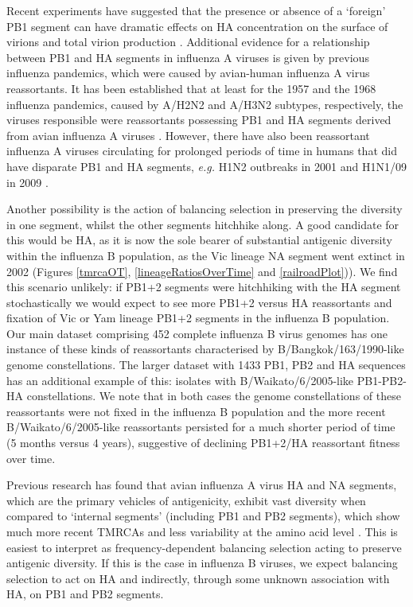 \documentclass[11pt,oneside,letterpaper]{article}
\begin{document}
Recent experiments have suggested that the presence or absence of a `foreign' PB1 segment can have dramatic effects on HA concentration on the surface of virions and total virion production \cite{cobbin2013}.
Additional evidence for a relationship between PB1 and HA segments in influenza A viruses is given by previous influenza pandemics, which were caused by avian-human influenza A virus reassortants.
It has been established that at least for the 1957 and the 1968 influenza pandemics, caused by A/H2N2 and A/H3N2 subtypes, respectively, the viruses responsible were reassortants possessing PB1 and HA segments derived from avian influenza A viruses \cite{kawaoka1989}.
However, there have also been reassortant influenza A viruses circulating for prolonged periods of time in humans that did have disparate PB1 and HA segments, \textit{e.g.} H1N2 outbreaks in 2001 \cite{gregory2002} and H1N1/09 in 2009 \cite{smith2009}.

Another possibility is the action of balancing selection in preserving the diversity in one segment, whilst the other segments hitchhike along.
A good candidate for this would be HA, as it is now the sole bearer of substantial antigenic diversity within the influenza B population, as the Vic lineage NA segment went extinct in 2002 (Figures \ref{tmrcaOT}, \ref{lineageRatiosOverTime} and \ref{railroadPlot})).
We find this scenario unlikely: if PB1+2 segments were hitchhiking with the HA segment stochastically we would expect to see more PB1+2 versus HA reassortants and fixation of Vic or Yam lineage PB1+2 segments in the influenza B population.
Our main dataset comprising 452 complete influenza B virus genomes has one instance of these kinds of reassortants characterised by B/Bangkok/163/1990-like genome constellations.
The larger dataset with 1433 PB1, PB2 and HA sequences has an additional example of this: isolates with B/Waikato/6/2005-like PB1-PB2-HA constellations.
We note that in both cases the genome constellations of these reassortants were not fixed in the influenza B population and the more recent B/Waikato/6/2005-like reassortants persisted for a much shorter period of time (5 months versus 4 years), suggestive of declining PB1+2/HA reassortant fitness over time.

Previous research has found that avian influenza A virus HA and NA segments, which are the primary vehicles of antigenicity, exhibit vast diversity when compared to `internal segments' (including PB1 and PB2 segments), which show much more recent TMRCAs and less variability at the amino acid level \cite{chen2006,obenauer2006}.
This is easiest to interpret as frequency-dependent balancing selection acting to preserve antigenic diversity.
If this is the case in influenza B viruses, we expect balancing selection to act on HA and indirectly, through some unknown association with HA, on PB1 and PB2 segments.
\end{document}
